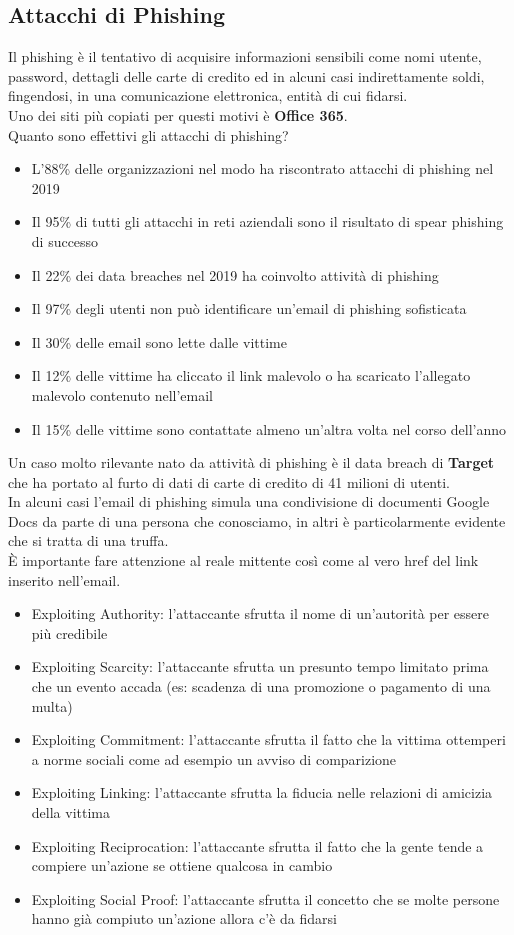 \subsection{Attacchi di Phishing}
Il phishing è il tentativo di acquisire informazioni sensibili come nomi utente, password, dettagli delle carte di credito ed in alcuni casi indirettamente soldi, fingendosi, in una comunicazione elettronica, entità di cui fidarsi.\\
Uno dei siti più copiati per questi motivi è \textbf{Office 365}.\\
Quanto sono effettivi gli attacchi di phishing?
\begin{itemize}[noitemsep]
    \item L'88\% delle organizzazioni nel modo ha riscontrato attacchi di phishing nel 2019
    \item Il 95\% di tutti gli attacchi in reti aziendali sono il risultato di spear phishing di successo
    \item Il 22\% dei data breaches nel 2019 ha coinvolto attività di phishing
    \item Il 97\% degli utenti non può identificare un'email di phishing sofisticata
    \item Il 30\% delle email sono lette dalle vittime
    \item Il 12\% delle vittime ha cliccato il link malevolo o ha scaricato l'allegato malevolo contenuto nell'email
    \item Il 15\% delle vittime sono contattate almeno un'altra volta nel corso dell'anno
\end{itemize}
Un caso molto rilevante nato da attività di phishing è il data breach di \textbf{Target} che ha portato al furto di dati di carte di credito di 41 milioni di utenti.\\
In alcuni casi l'email di phishing simula una condivisione di documenti Google Docs da parte di una persona che conosciamo, in altri è particolarmente evidente che si tratta di una truffa.\\
È importante fare attenzione al reale mittente così come al vero href del link inserito nell'email.\\
\begin{itemize}[noitemsep]
    \item Exploiting Authority: l'attaccante sfrutta il nome di un'autorità per essere più credibile
    \item Exploiting Scarcity: l'attaccante sfrutta un presunto tempo limitato prima che un evento accada (es: scadenza di una promozione o pagamento di una multa)
    \item Exploiting Commitment: l'attaccante sfrutta il fatto che la vittima ottemperi a norme sociali come ad esempio un avviso di comparizione
    \item Exploiting Linking: l'attaccante sfrutta la fiducia nelle relazioni di amicizia della vittima
    \item Exploiting Reciprocation: l'attaccante sfrutta il fatto che la gente tende a compiere un'azione se ottiene qualcosa in cambio
    \item Exploiting Social Proof: l'attaccante sfrutta il concetto che se molte persone hanno già compiuto un'azione allora c'è da fidarsi
\end{itemize}
